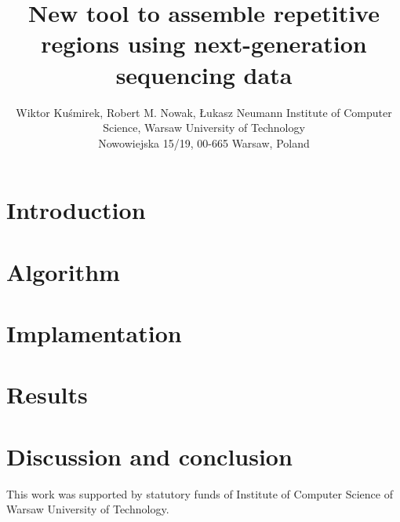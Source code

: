 \documentclass[]{spie}
\title{New tool to assemble repetitive regions using next-generation sequencing data} %
\author{Wiktor Ku\'{s}mirek, Robert M. Nowak, \L{}ukasz Neumann
  \skiplinehalf
  Institute of Computer Science,  Warsaw University of Technology\\
  Nowowiejska 15/19, 00-665 Warsaw, Poland\\
}
\begin{document}
\maketitle

\begin{abstract}


\end{abstract}


\section{Introduction}
\label{secIntroduction}


\section{Algorithm}
\label{secAlgortihm}

\section{Implamentation}
\label{secImplementation}

\section{Results}
\label{secResults}

\section{Discussion and conclusion}
\label{secDiscussion}

\cite{bioweb}


\acknowledgments

This work was supported by statutory funds of Institute of Computer Science of Warsaw University of Technology.



\end{document}
